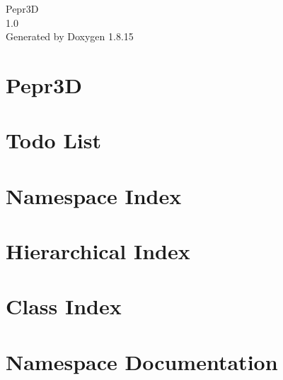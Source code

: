\let\mypdfximage\pdfximage\def\pdfximage{\immediate\mypdfximage}\documentclass[twoside]{book}
\newcommand{\+}{\discretionary{\mbox{\scriptsize$\hookleftarrow$}}{}{}}
\newcommand{\clearemptydoublepage}{%
  \newpage{\pagestyle{empty}\cleardoublepage}%
}
\begin{document}
\hypersetup{pageanchor=false,
             bookmarksnumbered=true,
             pdfencoding=unicode
            }
\begin{titlepage}
\vspace*{7cm}
\begin{center}%
{\Large Pepr3D \\[1ex]\large 1.\+0 }\\
\vspace*{1cm}
{\large Generated by Doxygen 1.8.15}\\
\end{center}
\end{titlepage}
\clearemptydoublepage
{}
\tableofcontents
\clearemptydoublepage
{}
\hypersetup{pageanchor=true}

\chapter{Pepr3D}
\label{index}\hypertarget{index}{}
\chapter{Todo List}
\label{todo}

\chapter{Namespace Index}

\chapter{Hierarchical Index}

\chapter{Class Index}

\chapter{Namespace Documentation}

\end{document}

